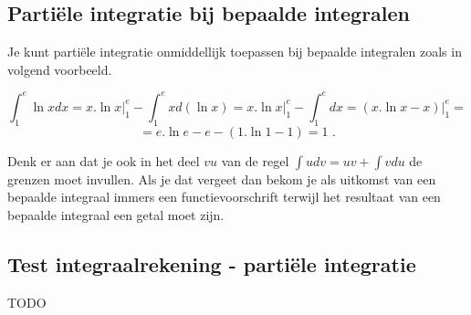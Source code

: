 \subsection{Parti\"ele integratie bij bepaalde integralen}

Je kunt parti\"ele integratie onmiddellijk toepassen bij bepaalde integralen zoals in volgend voorbeeld.

\[
\int ^e_1 \ln x dx=x.\ln x \vert ^e_1- \int ^e_1 x d(\ln x)=x.\ln x \vert ^e_1-\int ^e_1dx=(x.\ln x -x)\vert ^e_1=
\]
\[
=e.\ln e - e - (1.\ln 1 -1)=1 \text { .}
\]

Denk er aan dat je ook in het deel $vu$ van de regel $\int udv=uv+\int vdu$ de grenzen moet invullen. Als je dat vergeet dan bekom je als uitkomst van een bepaalde integraal immers een functievoorschrift terwijl het resultaat van een bepaalde integraal een getal moet zijn.


\subsection{Test integraalrekening - parti\"ele integratie}
TODO